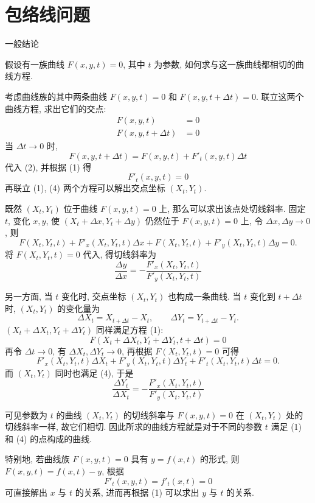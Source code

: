 \section{包络线问题}

\noindent 一般结论

假设有一族曲线 $F(x,y,t)=0$, 其中 $t$ 为参数, 如何求与这一族曲线都相切的曲线方程.

考虑曲线族的其中两条曲线 $F(x,y,t)=0$ 和 $F(x,y,t+\Delta t)=0$. 联立这两个曲线方程, 求出它们的交点:
\begin{align*}
F(x,y,t) &= 0 \tag{1} \\
F(x,y,t+\Delta t) &= 0 \tag{2}
\end{align*}
当 $\Delta t\to 0$ 时, 
\[ F(x,y,t+\Delta t) = F(x,y,t) + F'_t(x,y,t)\Delta t  \tag{3} \] 
代入 (2), 并根据 (1) 得
\[ F'_t(x,y,t) = 0 \tag{4} \]
再联立 (1), (4) 两个方程可以解出交点坐标 $(X_t, Y_t)$.

既然 $(X_t, Y_t)$ 位于曲线 $F(x,y,t)=0$ 上, 那么可以求出该点处切线斜率. 固定 $t$, 变化 $x,y$, 使 $(X_t+\Delta x, Y_t + \Delta y)$ 仍然位于 $F(x,y,t)=0$ 上, 令 $\Delta x, \Delta y\to 0$, 则
\[ F(X_t,Y_t,t) + F'_x(X_t,Y_t,t)\Delta x + F(X_t,Y_t,t) + F'_y(X_t,Y_t,t)\Delta y = 0 .\]
将 $F(X_t,Y_t,t)=0$ 代入, 得切线斜率为
\[ \frac{\Delta y}{\Delta x} = -\frac{ F'_x(X_t,Y_t,t)}{ F'_y(X_t,Y_t,t)}  \tag{5}\]

另一方面, 当 $t$ 变化时, 交点坐标 $(X_t, Y_t)$ 也构成一条曲线. 当 $t$ 变化到 $t+\Delta t$ 时, $(X_t, Y_t)$ 的变化量为 
\[ \Delta X_t = X_{t+\Delta t} - X_t, \qquad \Delta Y_t =Y_{t+\Delta t} - Y_t .\]
$(X_t+\Delta X_t, Y_t+\Delta Y_t)$ 同样满足方程 (1): 
\[ F(X_t+\Delta X_t, Y_t+\Delta Y_t, t+\Delta t) = 0 \tag{6} \]
再令 $\Delta t \to 0$, 有 $\Delta X_t, \Delta Y_t\to 0$, 再根据 $F(X_t,Y_t,t)=0$ 可得
\[ F'_x(X_t, Y_t, t) \Delta X_t + F'_y(X_t, Y_t, t) \Delta Y_t +  F'_t(X_t, Y_t, t)\Delta t = 0.\]
而 $(X_t,Y_t)$ 同时也满足 (4), 于是
\[\frac{\Delta Y_t}{\Delta X_t} = -\frac{ F'_x(X_t,Y_t,t)}{ F'_y(X_t,Y_t,t)} \tag{7} \]

可见参数为 $t$ 的曲线 $(X_t, Y_t)$ 的切线斜率与 $F(x,y,t)=0$ 在 $(X_t, Y_t)$ 处的切线斜率一样, 故它们相切. 因此所求的曲线方程就是对于不同的参数 $t$ 满足 (1) 和 (4) 的点构成的曲线.

特别地, 若曲线族 $F(x,y,t)=0$ 具有 $y=f(x,t)$ 的形式, 则 $F(x,y,t)=f(x,t)-y$, 根据
\[ F'_t(x,y,t) = f'_t(x,t) = 0 \]
可直接解出 $x$ 与 $t$ 的关系, 进而再根据 (1) 可以求出 $y$ 与 $t$ 的关系.

\newpage

